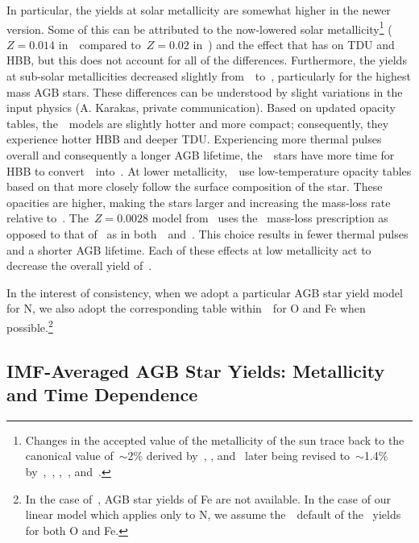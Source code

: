 \documentclass[ms.tex]{subfiles}
\begin{document}
In particular, the yields at solar metallicity are somewhat higher in the
newer version.
Some of this can be attributed to the now-lowered solar metallicity\footnote{
	Changes in the accepted value of the metallicity of the sun trace back to
	the canonical value of~$\sim$2\% derived by~\citet{Anders1989},
	\citet{Grevesse1993}, and~\citet{Grevesse1998} later being revised
	to~$\sim$1.4\% by~\citet{Lodders2003},~\citet*{Asplund2005},
	\citet*{Lodders2009},~\citet{Asplund2009}, and~\citet*{Asplund2021}.
} ($Z = 0.014$ in~\karakas~compared to~$Z = 0.02$ in~\karakasten) and the
effect that has on TDU and HBB, but this does not account for all of the
differences.
Furthermore, the yields at sub-solar metallicities decreased slightly
from~\karakasten~to~\karakas, particularly for the highest mass AGB stars.
These differences can be understood by slight variations in the input physics
(A. Karakas, private communication).
Based on updated opacity tables, the~\karakas~models are slightly hotter and
more compact; consequently, they experience hotter HBB and deeper TDU.
Experiencing more thermal pulses overall and consequently a longer AGB lifetime,
the~\karakas~stars have more time for HBB to convert~\Ctwelve~into~\Nfourteen.
At lower metallicity,~\karakas~use low-temperature opacity tables based on
\citet{Marigo2002} that more closely follow the surface composition of the
star.
These opacities are higher, making the stars larger and increasing the
mass-loss rate relative to~\karakasten.
The~$Z = 0.0028$ model from~\citet{Karakas2018} uses the~\citet{Bloecker1995}
mass-loss prescription as opposed to that of~\citet{Vassiliadis1993} as in
both~\citet{Karakas2010}~and~\citet{Karakas2016}.
This choice results in fewer thermal pulses and a shorter AGB lifetime.
Each of these effects at low metallicity act to decrease the overall yield
of~\Nfourteen.
\par
In the interest of consistency, when we adopt a particular AGB star yield model
for N, we also adopt the corresponding table within~\vice~for O and Fe when
possible.\footnote{
	In the case of~\citet{Ventura2013, Ventura2014, Ventura2018, Ventura2020},
	AGB star yields of Fe are not available.
	In the case of our linear model which applies only to N, we assume 
	the~\vice~default of the~\citet{Cristallo2011, Cristallo2015} yields for
	both O and Fe.
}

\subsection{IMF-Averaged AGB Star Yields: Metallicity and Time Dependence}
\label{sec:yields:imf_agb}
\end{document}
